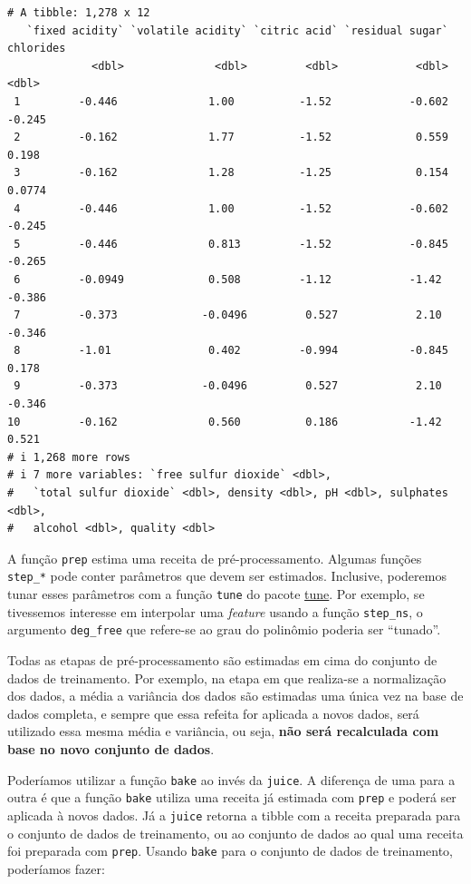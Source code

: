 \documentclass[
  letterpaper,
  DIV=11,
  numbers=noendperiod,
  oneside]{scrartcl}
\begin{document}
\begin{verbatim}
# A tibble: 1,278 x 12
   `fixed acidity` `volatile acidity` `citric acid` `residual sugar` chlorides
             <dbl>              <dbl>         <dbl>            <dbl>     <dbl>
 1         -0.446              1.00          -1.52            -0.602   -0.245 
 2         -0.162              1.77          -1.52             0.559    0.198 
 3         -0.162              1.28          -1.25             0.154    0.0774
 4         -0.446              1.00          -1.52            -0.602   -0.245 
 5         -0.446              0.813         -1.52            -0.845   -0.265 
 6         -0.0949             0.508         -1.12            -1.42    -0.386 
 7         -0.373             -0.0496         0.527            2.10    -0.346 
 8         -1.01               0.402         -0.994           -0.845    0.178 
 9         -0.373             -0.0496         0.527            2.10    -0.346 
10         -0.162              0.560          0.186           -1.42     0.521 
# i 1,268 more rows
# i 7 more variables: `free sulfur dioxide` <dbl>,
#   `total sulfur dioxide` <dbl>, density <dbl>, pH <dbl>, sulphates <dbl>,
#   alcohol <dbl>, quality <dbl>
\end{verbatim}

A função \texttt{prep} estima uma receita de pré-processamento. Algumas
funções \texttt{step\_*} pode conter parâmetros que devem ser estimados.
Inclusive, poderemos tunar esses parâmetros com a função \texttt{tune}
do pacote \href{https://tune.tidymodels.org/}{tune}. Por exemplo, se
tivessemos interesse em interpolar uma \emph{feature} usando a função
\texttt{step\_ns}, o argumento \texttt{deg\_free} que refere-se ao grau
do polinômio poderia ser ``tunado''.

Todas as etapas de pré-processamento são estimadas em cima do conjunto
de dados de treinamento. Por exemplo, na etapa em que realiza-se a
normalização dos dados, a média a variância dos dados são estimadas uma
única vez na base de dados completa, e sempre que essa refeita for
aplicada a novos dados, será utilizado essa mesma média e variância, ou
seja, \textbf{não será recalculada com base no novo conjunto de dados}.

Poderíamos utilizar a função \texttt{bake} ao invés da \texttt{juice}. A
diferença de uma para a outra é que a função \texttt{bake} utiliza uma
receita já estimada com \texttt{prep} e poderá ser aplicada à novos
dados. Já a \texttt{juice} retorna a tibble com a receita preparada para
o conjunto de dados de treinamento, ou ao conjunto de dados ao qual uma
receita foi preparada com \texttt{prep}. Usando \texttt{bake} para o
conjunto de dados de treinamento, poderíamos fazer:
\end{document}
